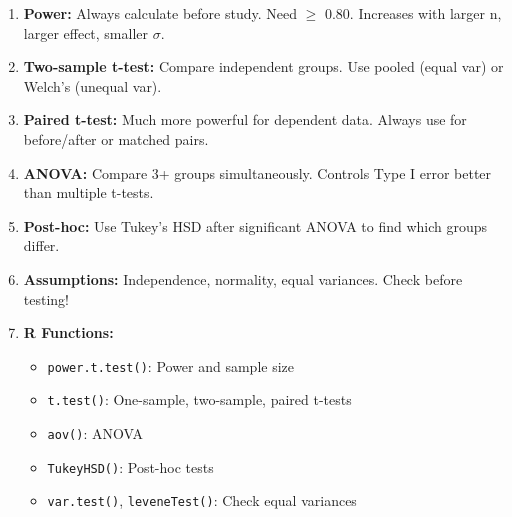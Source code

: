 \documentclass[11pt]{article}
\begin{document}
\begin{enumerate}
\item \textbf{Power:} Always calculate before study. Need $\geq$ 0.80. Increases with larger n, larger effect, smaller $\sigma$.
\item \textbf{Two-sample t-test:} Compare independent groups. Use pooled (equal var) or Welch's (unequal var).
\item \textbf{Paired t-test:} Much more powerful for dependent data. Always use for before/after or matched pairs.
\item \textbf{ANOVA:} Compare 3+ groups simultaneously. Controls Type I error better than multiple t-tests.
\item \textbf{Post-hoc:} Use Tukey's HSD after significant ANOVA to find which groups differ.
\item \textbf{Assumptions:} Independence, normality, equal variances. Check before testing!
\item \textbf{R Functions:}
  \begin{itemize}
  \item \texttt{power.t.test()}: Power and sample size
  \item \texttt{t.test()}: One-sample, two-sample, paired t-tests
  \item \texttt{aov()}: ANOVA
  \item \texttt{TukeyHSD()}: Post-hoc tests
  \item \texttt{var.test()}, \texttt{leveneTest()}: Check equal variances
  \end{itemize}
\end{enumerate}
\end{document}
